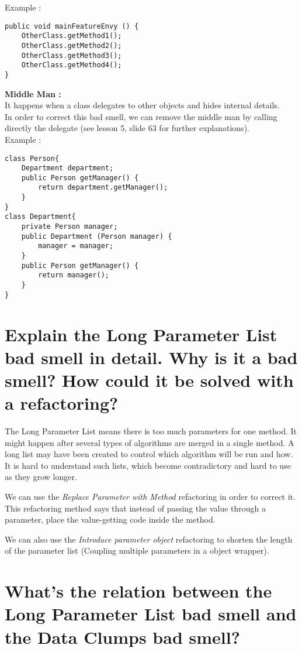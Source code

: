 Example : \\
\begin{lstlisting}
public void mainFeatureEnvy () {
	OtherClass.getMethod1(); 
	OtherClass.getMethod2();
	OtherClass.getMethod3();
	OtherClass.getMethod4();
}
\end{lstlisting}

\vspace{12pt}\textbf{Middle Man :}\\
It happens when a class delegates to other objects and hides internal details.\\
In order to correct this bad smell, we can remove the middle man by calling directly the delegate (see lesson 5, slide 63 for further explanations).\\

Example : \\
\begin{lstlisting}
class Person{
	Department department;
	public Person getManager() {
		return department.getManager();
	}
}
class Department{
	private Person manager;
	public Department (Person manager) {
		manager = manager; 
	}
	public Person getManager() {
		return manager();
	}
}
\end{lstlisting}

\section{Explain the Long Parameter List bad smell in detail. Why is it a bad smell? How could it be
solved with a refactoring?}

The Long Parameter List means there is too much parameters for one method. It might happen after several types of algorithms are merged in a single method. A long list may have been created to control which algorithm will be run and how.\\
It is hard to understand such lists, which become contradictory and hard to use as they grow longer.\newline

We can use the \textit{Replace Parameter with Method} refactoring in order to correct it. This refactoring method says that instead of passing the value through a parameter, place the value-getting code inside the method.

We can also use the \textit{Introduce parameter object} refactoring to shorten the length of the parameter list (Coupling multiple parameters in a object wrapper).
 
\section{What’s the relation between the Long Parameter List bad smell and the Data Clumps bad
smell?}

